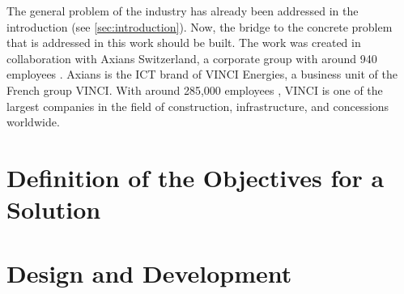 \begin{English}
    The general problem of the industry has already been addressed in the introduction (see \ref{sec:introduction}). Now, the bridge to the concrete problem that is addressed in this work should be built. The work was created in collaboration with Axians Switzerland, a corporate group with around 940 employees \cite{AxiansSchweiz}. Axians is the ICT brand of VINCI Energies, a business unit of the French group VINCI. With around 285,000 employees \cite{VINCI2025}, VINCI is one of the largest companies in the field of construction, infrastructure, and concessions worldwide.
\end{English}
  

\section{Definition of the Objectives for a Solution}
\label{sec:objectives}

\section{Design and Development}
\label{sec:design_development}
